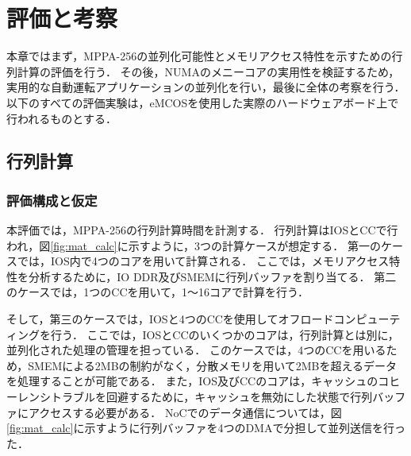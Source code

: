 \documentclass[submit,techrep]{ipsj_v2/UTF8/ipsj}
\begin{document}
\section{評価と考察}
\label{sec:evaluations}
本章ではまず，MPPA-256の並列化可能性とメモリアクセス特性を示すための行列計算の評価を行う．
その後，NUMAのメニーコアの実用性を検証するため，実用的な自動運転アプリケーションの並列化を行い，最後に全体の考察を行う．
以下のすべての評価実験は，eMCOSを使用した実際のハードウェアボード上で行われるものとする．


\vspace{-2mm}
\subsection{行列計算}
\label{sec:martix_eval}

\subsubsection{評価構成と仮定}
\label{sec:situations_and_assumptions}
本評価では，MPPA-256の行列計算時間を計測する．
行列計算はIOSとCCで行われ，図\ref{fig:mat_calc}に示すように，3つの計算ケースが想定する．
第一のケースでは，IOS内で4つのコアを用いて計算される．
ここでは，メモリアクセス特性を分析するために，IO DDR及びSMEMに行列バッファを割り当てる．
第二のケースでは，1つのCCを用いて，1～16コアで計算を行う．

そして，第三のケースでは，IOSと4つのCCを使用してオフロードコンピューティングを行う．
ここでは，IOSとCCのいくつかのコアは，行列計算とは別に，並列化された処理の管理を担っている．
このケースでは，4つのCCを用いるため，SMEMによる2MBの制約がなく，分散メモリを用いて2MBを超えるデータを処理することが可能である．
また，IOS及びCCのコアは，キャッシュのコヒーレンシトラブルを回避するために，キャッシュを無効にした状態で行列バッファにアクセスする必要がある．
NoCでのデータ通信については，図\ref{fig:mat_calc}に示すように行列バッファを4つのDMAで分担して並列送信を行った．
\end{document}
